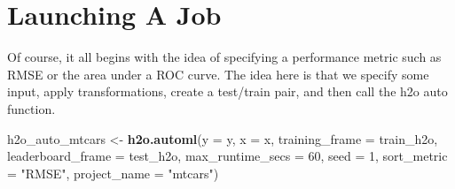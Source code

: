 \documentclass[]{book}
\newenvironment{Shaded}{\begin{snugshade}}{\end{snugshade}}
\newcommand{\KeywordTok}[1]{\textcolor[rgb]{0.13,0.29,0.53}{\textbf{#1}}}
\newcommand{\DataTypeTok}[1]{\textcolor[rgb]{0.13,0.29,0.53}{#1}}
\newcommand{\DecValTok}[1]{\textcolor[rgb]{0.00,0.00,0.81}{#1}}
\newcommand{\StringTok}[1]{\textcolor[rgb]{0.31,0.60,0.02}{#1}}
\newcommand{\NormalTok}[1]{#1}
\begin{document}
\section{Launching A Job}\label{launching-a-job}

Of course, it all begins with the idea of specifying a performance
metric such as RMSE or the area under a ROC curve. The idea here is that
we specify some input, apply transformations, create a test/train pair,
and then call the h2o auto function.

\begin{Shaded}
\begin{Highlighting}[]
\NormalTok{h2o_auto_mtcars <-}\StringTok{ }\KeywordTok{h2o.automl}\NormalTok{(}\DataTypeTok{y =}\NormalTok{ y, }\DataTypeTok{x =}\NormalTok{ x,}
                              \DataTypeTok{training_frame =}\NormalTok{ train_h2o,}
                              \DataTypeTok{leaderboard_frame =}\NormalTok{ test_h2o,}
                              \DataTypeTok{max_runtime_secs =} \DecValTok{60}\NormalTok{,}
                              \DataTypeTok{seed =} \DecValTok{1}\NormalTok{,}
                              \DataTypeTok{sort_metric =} \StringTok{"RMSE"}\NormalTok{,}
                              \DataTypeTok{project_name =} \StringTok{"mtcars"}\NormalTok{)}
\end{Highlighting}
\end{Shaded}
\end{document}
